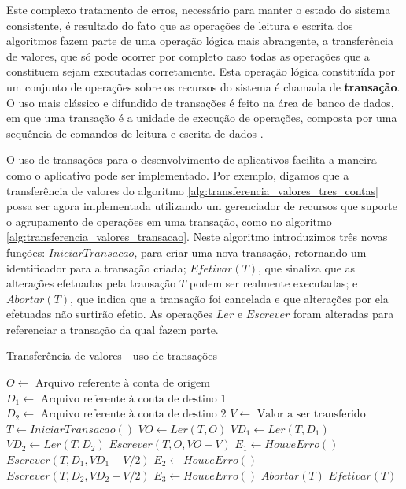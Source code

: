 \documentclass[11pt,twoside,a4paper]{book}
\begin{document}
Este complexo tratamento de erros, necessário para manter o estado do sistema consistente, é resultado do fato que as operações de leitura e escrita dos algoritmos fazem parte de uma operação lógica mais abrangente, a transferência de valores, que só pode ocorrer por completo caso todas as operações que a constituem sejam executadas corretamente. Esta operação lógica constituída por um conjunto de operações sobre os recursos do sistema é chamada de \textbf{transação}. O uso mais clássico e difundido de transações é feito na área de banco de dados, em que uma transação é a unidade de execução de operações, composta por uma sequência de comandos de leitura e escrita de dados \cite{garcia-molina, vaca}.

O uso de transações para o desenvolvimento de aplicativos facilita a maneira como o aplicativo pode ser implementado. Por exemplo, digamos que a transferência de valores do algoritmo \ref{alg:transferencia_valores_tres_contas} possa ser agora implementada utilizando um gerenciador de recursos que suporte o agrupamento de operações em uma transação, como no algoritmo \ref{alg:transferencia_valores_transacao}. Neste algoritmo introduzimos três novas funções: $IniciarTransacao$, para criar uma nova transação, retornando um identificador para a transação criada; $Efetivar(T)$, que sinaliza que as alterações efetuadas pela transação $T$ podem ser realmente executadas; e $Abortar(T)$, que indica que a transação foi cancelada e que alterações por ela efetuadas não surtirão efetio. As operações $Ler$ e $Escrever$ foram alteradas para referenciar a transação da qual fazem parte.

\begin{algorithm}
\caption{Transferência de valores - uso de transações}
\label{alg:transferencia_valores_transacao}
\begin{algorithmic}[1]
\State $O \gets \text{ Arquivo referente à conta de origem}$
\State $D_1 \gets \text{ Arquivo referente à conta de destino 1}$
\State $D_2 \gets \text{ Arquivo referente à conta de destino 2}$
\State $V \gets \text{ Valor a ser transferido}$
\State $T \gets IniciarTransacao()$
\State $VO \gets Ler(T, O)$
    \State $VD_1 \gets Ler(T, D_1)$
    \State $VD_2 \gets Ler(T, D_2)$
    \State $Escrever(T, O, VO - V)$
    \State $E_1 \gets HouveErro()$
    \State $Escrever(T, D_1, VD_1 + V/2)$
    \State $E_2 \gets HouveErro()$
    \State $Escrever(T, D_2, VD_2 + V/2)$
    \State $E_3 \gets HouveErro()$
        \State $Abortar(T)$
    \Else
        \State $Efetivar(T)$
    \EndIf
\EndIf
\end{algorithmic}
\end{algorithm}
\end{document}

